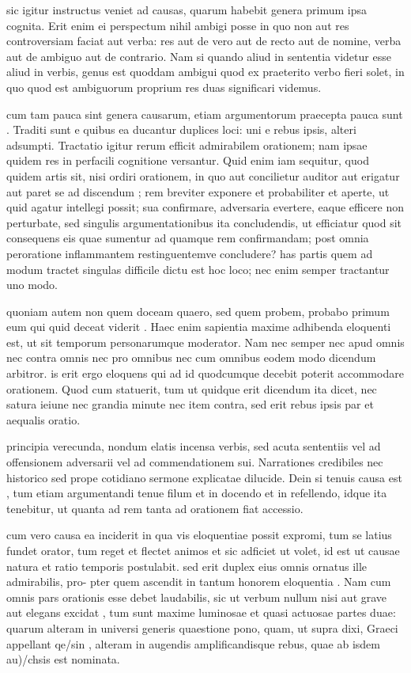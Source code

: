  sic igitur instructus veniet ad causas, quarum habebit genera primum ipsa cognita. Erit enim ei perspectum nihil ambigi posse in quo non aut res controversiam faciat aut verba: res aut de vero aut de recto aut de nomine, verba aut de ambiguo aut de contrario. Nam si quando aliud in sententia videtur esse aliud in verbis, genus est quoddam ambigui quod ex praeterito verbo fieri solet, in quo quod est ambiguorum proprium res duas significari videmus.

 cum tam pauca sint genera causarum, etiam argumentorum praecepta pauca sunt . Traditi sunt e quibus ea ducantur duplices loci: uni e rebus ipsis, alteri adsumpti. Tractatio igitur rerum efficit admirabilem orationem; nam ipsae quidem res in perfacili cognitione versantur. Quid enim iam sequitur, quod quidem artis sit, nisi ordiri orationem, in quo aut concilietur auditor aut erigatur aut paret se ad discendum ; rem breviter exponere et probabiliter et aperte, ut quid agatur intellegi possit; sua confirmare, adversaria evertere, eaque efficere non perturbate, sed singulis argumentationibus ita concludendis, ut efficiatur quod sit consequens eis quae sumentur ad quamque rem confirmandam; post omnia peroratione inflammantem restinguentemve concludere? has partis quem ad modum tractet singulas difficile dictu est hoc loco; nec enim semper tractantur uno modo.

 quoniam autem non quem doceam quaero, sed quem probem, probabo primum eum qui quid deceat viderit . Haec enim sapientia maxime adhibenda eloquenti est, ut sit temporum personarumque moderator. Nam nec semper nec apud omnis nec contra omnis nec pro omnibus nec cum omnibus eodem modo dicendum arbitror. is erit ergo eloquens qui ad id quodcumque decebit poterit accommodare orationem. Quod cum statuerit, tum ut quidque erit dicendum ita dicet, nec satura ieiune nec grandia minute nec item contra, sed erit rebus ipsis par et aequalis oratio.

 principia verecunda, nondum elatis incensa verbis, sed acuta sententiis vel ad offensionem adversarii vel ad commendationem sui. Narrationes credibiles nec historico sed prope cotidiano sermone explicatae dilucide. Dein si tenuis causa est , tum etiam argumentandi tenue filum et in docendo et in refellendo, idque ita tenebitur, ut quanta ad rem tanta ad orationem fiat accessio.

 cum vero causa ea inciderit in qua vis eloquentiae possit expromi, tum se latius fundet orator, tum reget et flectet animos et sic adficiet ut volet, id est ut causae natura et ratio temporis postulabit. sed erit duplex eius omnis ornatus ille admirabilis, pro- pter quem ascendit in tantum honorem eloquentia . Nam cum omnis pars orationis esse debet laudabilis, sic ut verbum nullum nisi aut grave aut elegans excidat , tum sunt maxime luminosae et quasi actuosae partes duae: quarum alteram in universi generis quaestione pono, quam, ut supra dixi, Graeci appellant qe/sin , alteram in augendis amplificandisque rebus, quae ab isdem au)/chsis est nominata.

